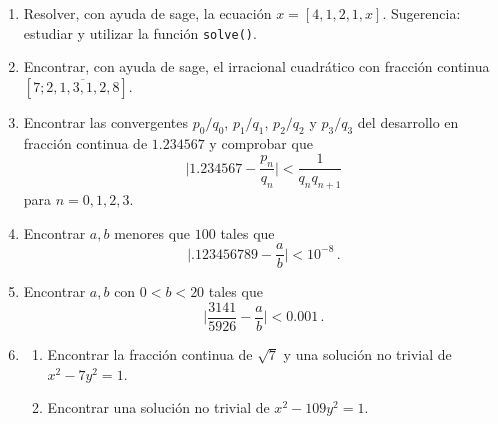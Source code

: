 	\begin{ejer}
	
	\begin{enumerate}
		
		\item Resolver, con ayuda de sage, la ecuación $x=[4,1,2,1,x]$. {\sc Sugerencia:} estudiar y utilizar la función {\tt solve()}.
		
		\item Encontrar, con ayuda de sage, el irracional cuadrático con fracción continua $[7; \overline{2, 1, 3, 1, 2, 8}]$.
		
		\item Encontrar las convergentes $p_0/q_0$, $p_1/q_1$, $p_2/q_2$ y $p_3/q_3$ del desarrollo en fracción continua de $1.234567$ y comprobar que
		$$
		\Big| 1.234567 - \frac{p_n}{q_n}\Big| < \frac1{q_nq_{n+1}}
		$$
		para $n=0,1,2,3$.
		
		\item Encontrar $a,b$ menores que $100$ tales que
		$$\big|.123456789 - \frac ab\big| < 10^{-8}\,.$$
		
		\item Encontrar $a,b$ con $0<b<20$ tales que
		$$\Big| \frac{3141}{5926}-\frac ab\Big|<0.001\,.$$
		
		\item \begin{enumerate}
			\item Encontrar la fracción continua de $\sqrt 7$ y una solución no trivial de $x^2-7y^2=1$.
			\item Encontrar una solución no trivial de $x^2-109y^2=1$.
		\end{enumerate}
		
	\end{enumerate}
	\end{ejer}
	




	
	

